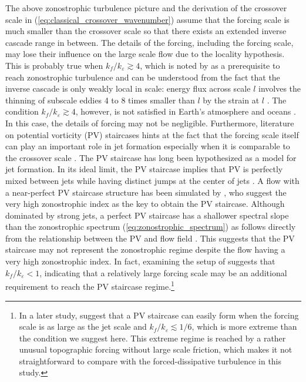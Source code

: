 \documentclass{jfm}
\begin{document}
The above zonostrophic turbulence picture and the derivation of
the crossover scale in (\ref{eq:classical_crossover_wavenumber}) assume
that the forcing scale is much smaller than the crossover scale so that
there exists an extended inverse cascade range in between.
The details of the forcing, including the forcing scale,
may lose their influence on the large scale flow due to
the locality hypothesis. This is probably true when $k_{f}/k_{\varepsilon}\apprge4$,
which is noted by \citet{Sukoriansky2007} as a prerequisite
to reach zonostrophic turbulence and can be understood from the fact
that the inverse cascade is only weakly local in scale: 
energy flux across scale $l$ involves
the thinning of subscale eddies 4 to 8 times smaller than $l$ by
the strain at $l$ \citep{Chen2006}.
The condition $k_{f}/k_{\varepsilon}\apprge4$, however, 
is not satisfied in Earth's atmosphere \citep{Schneider2006,Merlis2009}
and oceans \citep{Tulloch2011}. In this case, the details of
forcing may not be negligible. Furthermore, literature 
on potential vorticity (PV) staircases hints at the fact that
the forcing scale itself can play an important role 
in jet formation especially when it is comparable to the crossover scale \citep{Scott2012}.
The PV staircase has long been hypothesized as a model for jet formation.
In its ideal limit, the PV staircase implies that PV is
perfectly mixed between jets while having distinct jumps at the center
of jets \citep{Marcus1993,Marcus1998,Dunkerton2008,Dritschel2008}.
A flow with a near-perfect PV staircase structure has been 
simulated by \citet{Scott2012}, who suggest the very high
zonostrophic index as the key to obtain the PV staircase. 
Although dominated by strong jets,
a perfect PV staircase has a shallower spectral slope than the zonostrophic spectrum
(\ref{eq:zonostrophic_spectrum}) as follows directly from the
relationship between the PV and flow field \citep{Saffman1971,Danilov2004}.
This suggests that the PV staircase may not represent the zonostrophic
regime despite the flow having a very high zonostrophic index. In fact,
examining the setup of \citet{Scott2012} suggests that 
$k_{f}/k_{\varepsilon}<1$, indicating that a relatively large forcing
scale may be an additional requirement to reach the PV staircase regime.\footnote{
In a later study, \citet{Scott2012a} suggest that a PV staircase can
easily form when the forcing scale is as large as the jet scale and
$k_{f}/k_{\varepsilon}\apprle1/6$, which is more extreme than the
condition we suggest here. This extreme regime is reached by a rather
unusual topographic forcing without large scale friction, which makes
it not straightforward to compare with the forced-dissipative turbulence
in this study.} 
\end{document}
